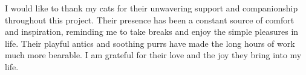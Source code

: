 \begin{acknowledgements}
I would like to thank my cats for their unwavering support and companionship throughout this project. Their presence has been a constant source of comfort and inspiration, reminding me to take breaks and enjoy the simple pleasures in life. Their playful antics and soothing purrs have made the long hours of work much more bearable. I am grateful for their love and the joy they bring into my life.
\end{acknowledgements}

